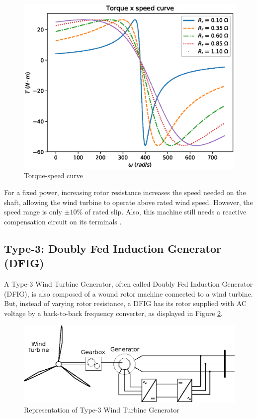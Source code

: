 \begin{figure}[h]
	\caption{Torque-speed curve}
	\begin{center}
		\includegraphics[scale=.6]{Images/Tw_curve.eps}
	\end{center}
	\label{fig: Tw}
\end{figure}

For a fixed power, increasing rotor resistance increases the speed needed on the shaft, allowing the wind turbine to operate above rated wind speed. However, the speed range is only $\pm 10\%$ of rated slip. Also, this machine still needs a reactive compensation circuit on its terminals \cite{Muljadi2010}.

\subsection{Type-3: Doubly Fed Induction Generator (DFIG)}

A Type-3 Wind Turbine Generator, often called Doubly Fed Induction Generator (DFIG), is also composed of a wound rotor machine connected to a wind turbine. But, instead of varying rotor resistance, a DFIG has its rotor supplied with AC voltage by a back-to-back frequency converter, as displayed in Figure \ref{fig: WTG3}. 

\begin{figure}[h]
	\caption{Representation of Type-3 Wind Turbine Generator}
	\begin{center}
		\includegraphics[scale=.8]{Images/Type3WTG.eps}
	\end{center}
	\label{fig: WTG3}
\end{figure}

